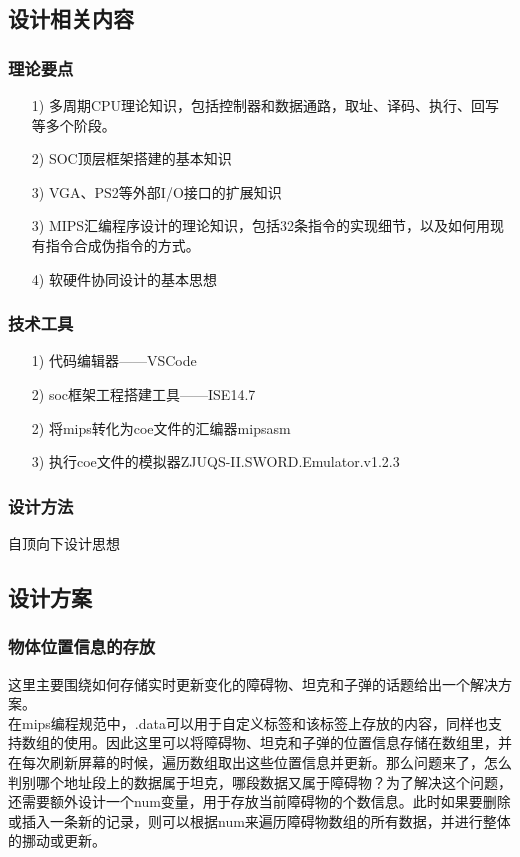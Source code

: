 \subsection{设计相关内容}
\subsubsection{理论要点}
\begin{itemize}
    \item[1)] 多周期CPU理论知识，包括控制器和数据通路，取址、译码、执行、回写等多个阶段。
    \item[2)] SOC顶层框架搭建的基本知识
    \item[3)] VGA、PS2等外部I/O接口的扩展知识
    \item[3)] MIPS汇编程序设计的理论知识，包括32条指令的实现细节，以及如何用现有指令合成伪指令的方式。
    \item[4)] 软硬件协同设计的基本思想
\end{itemize}

\subsubsection{技术工具}
\begin{itemize}
    \item[1)] 代码编辑器——VSCode
    \item[2)] soc框架工程搭建工具——ISE14.7
    \item[2)] 将mips转化为coe文件的汇编器mipsasm
    \item[3)] 执行coe文件的模拟器ZJUQS-II.SWORD.Emulator.v1.2.3
\end{itemize}

\subsubsection{设计方法}
自顶向下设计思想\\

\subsection{设计方案}
\subsubsection{物体位置信息的存放}
这里主要围绕如何存储实时更新变化的障碍物、坦克和子弹的话题给出一个解决方案。\\

在mips编程规范中，.data可以用于自定义标签和该标签上存放的内容，同样也支持数组的使用。因此这里可以将障碍物、坦克和子弹的位置信息存储在数组里，并在每次刷新屏幕的时候，遍历数组取出这些位置信息并更新。那么问题来了，怎么判别哪个地址段上的数据属于坦克，哪段数据又属于障碍物？为了解决这个问题，还需要额外设计一个num变量，用于存放当前障碍物的个数信息。此时如果要删除或插入一条新的记录，则可以根据num来遍历障碍物数组的所有数据，并进行整体的挪动或更新。\\


